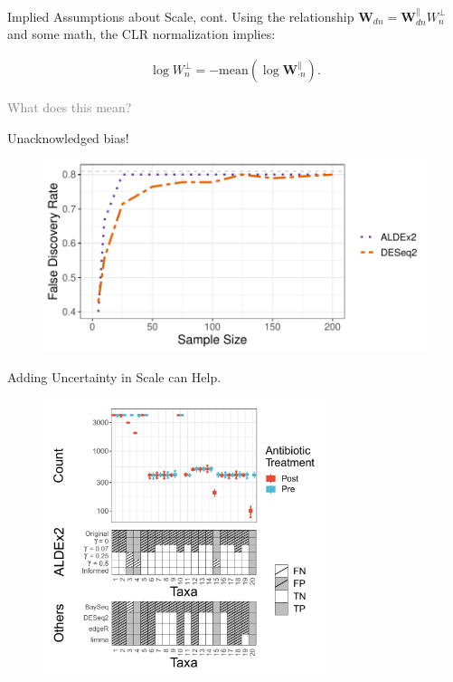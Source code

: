 \documentclass[
  ignorenonframetext,
]{beamer}
\begin{document}
\begin{frame}{Implied Assumptions about Scale, cont.}
\protect\hypertarget{implied-assumptions-about-scale-cont.}{}
Using the relationship
\(\mathbf{W}_{dn} = \mathbf{W}_{dn}^\parallel W_n^\perp\) and some math,
the CLR normalization implies:

\begin{align*}
\log W_n^\perp = -\text{mean}(\log \mathbf{W}_{\cdot n}^\parallel).
\end{align*}

\vspace{.25in}

\textcolor{gray}{What does this mean?}
\end{frame}

\begin{frame}{Unacknowledged bias!}
\protect\hypertarget{unacknowledged-bias}{}
\begin{figure}
  \centering
  \includegraphics[width=4.5in]{figures/unacknowledged_bias.pdf}
\end{figure}
\end{frame}

\begin{frame}{Adding Uncertainty in Scale can Help.}
\protect\hypertarget{adding-uncertainty-in-scale-can-help.}{}
\begin{figure}
  \centering
  \includegraphics[width=3.25in]{figures/sim-res.pdf}
\end{figure}
\end{frame}
\end{document}
